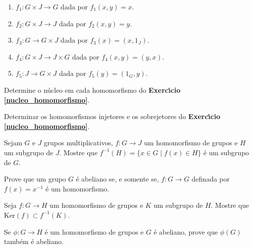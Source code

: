 \documentclass[12pt]{exam}
\begin{document}
    \begin{enumerate}[label=({\alph*})]
      \item $f_1 : G \times J \to G$ dada por $f_1(x,y) = x$.

      \item $f_2 : G \times J \to J$ dada por $f_2(x,y) = y$.

      \item $f_3 : G  \to G \times J$ dada por $f_3(x) = (x, 1_J)$.

      \item $f_4 : G \times J \to J \times G$ dada por $f_4(x,y) = (y, x)$.

      \item $f_5 : J \to G \times J$ dada por $f_5(y) = (1_G, y)$.
    \end{enumerate}

    \vspace{.3cm}

    \questao{} Determine o n\'ucleo em cada homomorfismo do \textbf{Exerc{\'\i}cio \ref{nucleo_homomorfismo}}.

    \vspace{.3cm}

    \questao{} Determinar os homomorfismos injetores e os sobrejetores do \textbf{Exerc{\'\i}cio \ref{nucleo_homomorfismo}}.

    \vspace{.3cm}

    \questao{} Sejam $G$ e $J$ grupos multiplicativos, $f : G \to J$ um homomorfismo de grupos e $H$ um subgrupo de $J$. Mostre que $f^{-1}(H) = \{ x \in G \mid f(x) \in H\}$ {\'e} um subgrupo de $G$.

    \vspace{.3cm}

    \questao{} Prove que um grupo $G$ {\'e} abeliano se, e somente se, $f : G \to G$ definada por $f(x) = x^{-1}$ {\'e} um homomorfismo.

    \vspace{.3cm}

    \questao{} Seja $f: G\to H$ um homomorfismo de grupos e $K$ um subgrupo de $H$. Mostre que Ker$(f)\subset f^{-1}(K)$.

    \vspace{.3cm}

    \questao{} Se $\phi : G \to H$ é um homomorfismo de grupos e $G$ é abeliano, prove que $\phi(G)$ também é abeliano.

    \vspace{.3cm}
\end{document}
